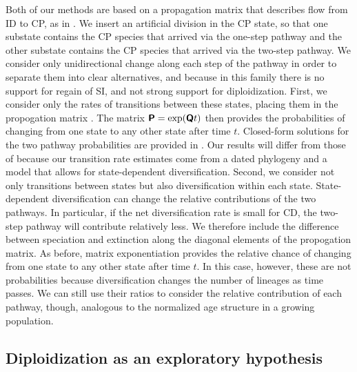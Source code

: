 Both of our methods are based on a propagation matrix that describes flow from ID to CP, as in \citet{robertson_2011}.
We insert an artificial division in the CP state, so that one substate contains the CP species that arrived via the one-step pathway and the other substate contains the CP species that arrived via the two-step pathway.
We consider only unidirectional change along each step of the pathway in order to separate them into clear alternatives, and because in this family there is no support for regain of SI, and not strong support for diploidization.
First, we consider only the rates of transitions between these states, placing them in the propogation matrix .
The matrix $\bm{\mathsf{P}} = \exp(\bm{\mathsf{Q}} t)$ then provides the probabilities of changing from one state to any other state after time $t$.
Closed-form solutions for the two pathway probabilities are provided in \citet{robertson_2011}.
Our results will differ from those of \citet{robertson_2011} because our transition rate estimates come from a dated phylogeny and a model that allows for state-dependent diversification.
%
Second, we consider not only transitions between states but also diversification within each state.
State-dependent diversification can change the relative contributions of the two pathways.
In particular, if the net diversification rate is small for CD, the two-step pathway will contribute relatively less.
We therefore include the difference between speciation and extinction along the diagonal elements of the propogation matrix.
As before, matrix exponentiation provides the relative chance of changing from one state to any other state after time $t$.
In this case, however, these are not probabilities because diversification changes the number of lineages as time passes.
We can still use their ratios to consider the relative contribution of each pathway, though, analogous to the normalized age structure in a growing population. %


\subsection{Diploidization as an exploratory hypothesis}

